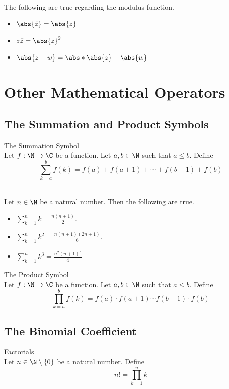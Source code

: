 \documentclass[a4paper]{article}
\begin{document}
\begin{lmm}{}{}\\
The following are true regarding the modulus function. 
\begin{itemize}
\item $\abs{\bar{z}}=\abs{z}$
\item $z\bar{z}=\abs{z}^2$
\item $\abs{z-w}=\abs*{\abs{z}-\abs{w}}$
\end{itemize}
\end{lmm}

\pagebreak
\section{Other Mathematical Operators}
\subsection{The Summation and Product Symbols}
\begin{defn}{The Summation Symbol}{}\\
Let $f:\N\to\C$ be a function. Let $a,b\in\N$ such that $a\leq b$. Define $$\sum_{k=a}^bf(k)=f(a)+f(a+1)+\cdots+f(b-1)+f(b)$$
\end{defn}

\begin{prp}{}{}\\
Let $n\in\N$ be a natural number. Then the following are true. 
\begin{itemize}
\item $\sum_{k=1}^nk=\frac{n(n+1)}{2}$. 
\item $\sum_{k=1}^nk^2=\frac{n(n+1)(2n+1)}{6}$. 
\item $\sum_{k=1}^nk^3=\frac{n^2(n+1)^2}{4}$
\end{itemize}
\end{prp}

\begin{defn}{The Product Symbol}{}\\
Let $f:\N\to\C$ be a function. Let $a,b\in\N$ such that $a\leq b$. Define $$\prod_{k=a}^bf(k)=f(a)\cdot f(a+1)\cdots f(b-1)\cdot f(b)$$
\end{defn}

\subsection{The Binomial Coefficient}
\begin{defn}{Factorials}{}\\
Let $n\in\N\setminus\{0\}$ be a natural number. Define $$n!=\prod_{k=1}^nk$$
\end{defn}
\end{document}
